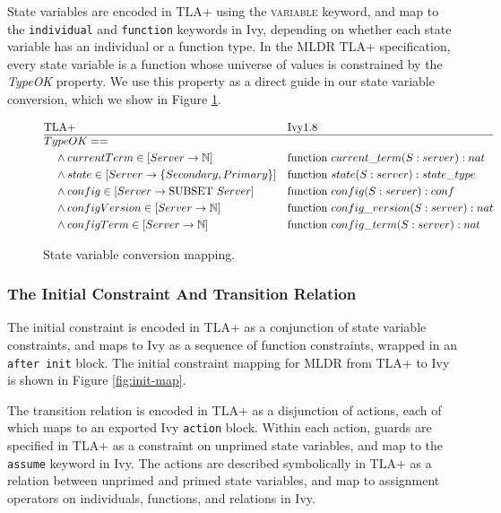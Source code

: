 \documentclass[runningheads]{llncs}
\newcommand{\tla}[1]{{\small\scshape #1}}
\newcommand{\ivy}[1]{{\texttt{#1}}}
\begin{document}
State variables are encoded in TLA+ using the \tla{variable} keyword, and map to the \ivy{individual} and \ivy{function} keywords in Ivy, depending on whether each state variable has an individual or a function type.  In the MLDR TLA+ specification, every state variable is a function whose universe of values is constrained by the \textit{TypeOK} property.  We use this property as a direct guide in our state variable conversion, which we show in Figure \ref{fig:statevar-map}.

\begin{figure}
  \begin{align*}
    &\text{TLA+} && \text{Ivy} 1.8\\
    \hline
    &TypeOK ==&&\\
      &\quad\land currentTerm \in [Server \to \mathbb{N}]& &\text{function } current\_term(S:server) : nat\\
      &\quad\land state \in [Server \to \{Secondary, Primary\}]& &\text{function } state(S:server) : state\_type\\
      &\quad\land config \in [Server \to \text{SUBSET } Server]& &\text{function } config(S:server) : conf\\
      &\quad\land configVersion \in [Server \to \mathbb{N}]& &\text{function } config\_version(S:server) : nat\\
      &\quad\land configTerm \in [Server \to \mathbb{N}]& &\text{function } config\_term(S:server) : nat\\
  \end{align*}
  \caption{State variable conversion mapping.}
  \label{fig:statevar-map}
\end{figure}

\subsubsection{The Initial Constraint And Transition Relation}

The initial constraint is encoded in TLA+ as a conjunction of state variable constraints, and maps to Ivy as a sequence of function constraints, wrapped in an \ivy{after init} block.    The initial constraint mapping for MLDR from TLA+ to Ivy is shown in Figure \ref{fig:init-map}.

The transition relation is encoded in TLA+ as a disjunction of actions, each of which maps to an exported Ivy \ivy{action} block.  Within each action, guards are specified in TLA+ as a constraint on unprimed state variables, and map to the \ivy{assume} keyword in Ivy.  The actions are described symbolically in TLA+ as a relation between unprimed and primed state variables, and map to assignment operators on individuals, functions, and relations in Ivy.
\end{document}
